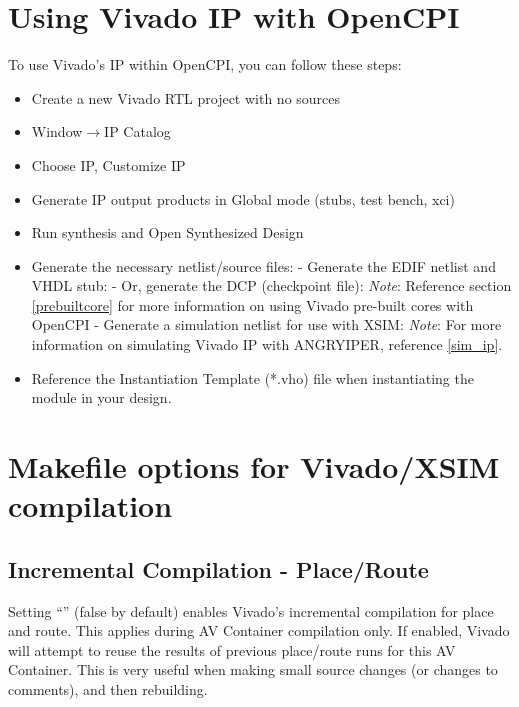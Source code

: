 \begin{flushleft}
\section{Using Vivado IP with OpenCPI}
To use Vivado's IP within OpenCPI, you can follow these steps:
\begin{itemize}
\item Create a new Vivado RTL project with no sources
\item Window$\rightarrow$IP Catalog
\item Choose IP, Customize IP
\item Generate IP output products in Global mode (stubs, test bench, xci)
\item Run synthesis and Open Synthesized Design
\item Generate the necessary netlist/source files:
\subitem - Generate the EDIF netlist and VHDL stub:
\subsubitem {}
\subsubitem {}
\subitem - Or, generate the DCP (checkpoint file):
\subsubitem {}
\subitem  \textit{Note}: Reference section \ref{prebuiltcore} for more information on using Vivado pre-built cores with OpenCPI
\subitem - Generate a simulation netlist for use with XSIM:
\subsubitem {}
\subsubitem \textit{Note}: For more information on simulating Vivado IP with ANGRYIPER, reference \ref{sim_ip}.
\item Reference the Instantiation Template (*.vho) file when instantiating the module in your design.
\end{itemize}

\section{Makefile options for Vivado/XSIM compilation}
\subsection{Incremental Compilation - Place/Route}
Setting ``'' (false by default) enables Vivado's incremental compilation for place and route. This applies during AV Container compilation only. If enabled, Vivado will attempt to reuse the results of previous place/route runs for this AV Container. This is very useful when making small source changes (or changes to comments), and then rebuilding.


\end{flushleft}
